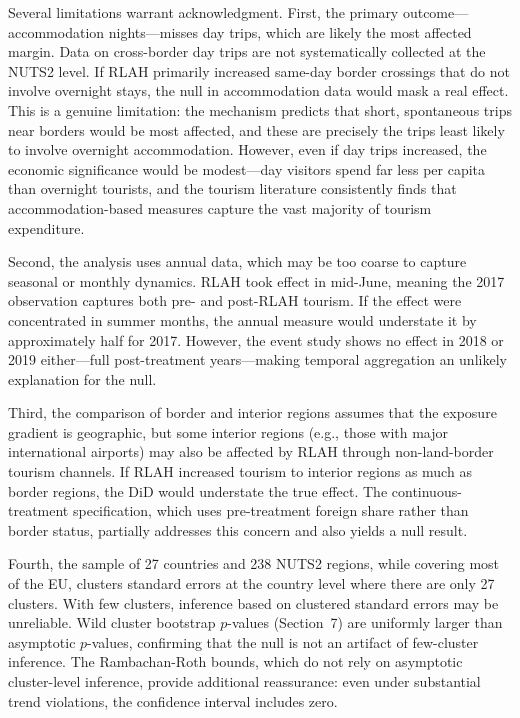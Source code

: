 \documentclass[12pt]{article}
\begin{document}
Several limitations warrant acknowledgment. First, the primary outcome---accommodation nights---misses day trips, which are likely the most affected margin. Data on cross-border day trips are not systematically collected at the NUTS2 level. If RLAH primarily increased same-day border crossings that do not involve overnight stays, the null in accommodation data would mask a real effect. This is a genuine limitation: the mechanism predicts that short, spontaneous trips near borders would be most affected, and these are precisely the trips least likely to involve overnight accommodation. However, even if day trips increased, the economic significance would be modest---day visitors spend far less per capita than overnight tourists, and the tourism literature consistently finds that accommodation-based measures capture the vast majority of tourism expenditure.

Second, the analysis uses annual data, which may be too coarse to capture seasonal or monthly dynamics. RLAH took effect in mid-June, meaning the 2017 observation captures both pre- and post-RLAH tourism. If the effect were concentrated in summer months, the annual measure would understate it by approximately half for 2017. However, the event study shows no effect in 2018 or 2019 either---full post-treatment years---making temporal aggregation an unlikely explanation for the null.

Third, the comparison of border and interior regions assumes that the exposure gradient is geographic, but some interior regions (e.g., those with major international airports) may also be affected by RLAH through non-land-border tourism channels. If RLAH increased tourism to interior regions as much as border regions, the DiD would understate the true effect. The continuous-treatment specification, which uses pre-treatment foreign share rather than border status, partially addresses this concern and also yields a null result.

Fourth, the sample of 27 countries and 238 NUTS2 regions, while covering most of the EU, clusters standard errors at the country level where there are only 27 clusters. With few clusters, inference based on clustered standard errors may be unreliable. Wild cluster bootstrap $p$-values (Section~7) are uniformly larger than asymptotic $p$-values, confirming that the null is not an artifact of few-cluster inference. The Rambachan-Roth bounds, which do not rely on asymptotic cluster-level inference, provide additional reassurance: even under substantial trend violations, the confidence interval includes zero.
\end{document}
